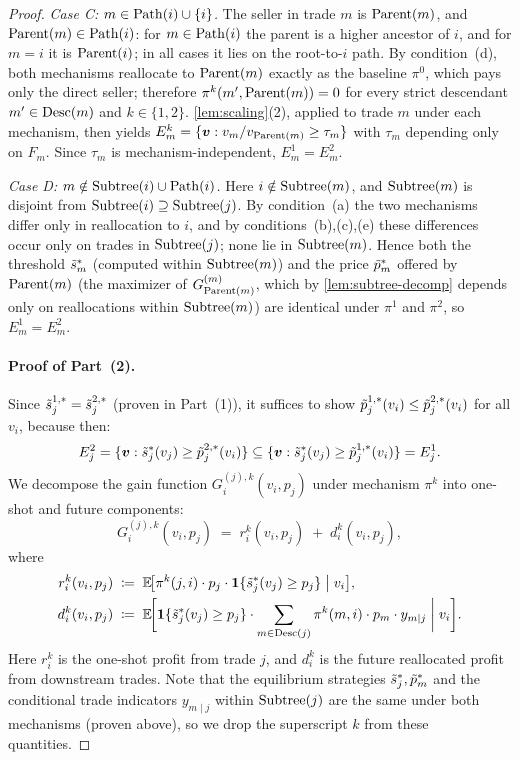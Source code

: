 \begin{proof}
\emph{Case C: $m \in \operatorname{Path}(i) \cup \{i\}$.}
The seller in trade $m$ is $\operatorname{Parent}(m)$, and $\operatorname{Parent}(m) \in \operatorname{Path}(i)$: for $m \in \operatorname{Path}(i)$ the parent is a higher ancestor of $i$, and for $m = i$ it is $\operatorname{Parent}(i)$; in all cases it lies on the root-to-$i$ path. By condition~(d), both mechanisms reallocate to $\operatorname{Parent}(m)$ exactly as the baseline $\pi^0$, which pays only the direct seller; therefore $\pi^k(m', \operatorname{Parent}(m)) = 0$ for every strict descendant $m' \in \operatorname{Desc}(m)$ and $k \in \{1,2\}$. \cref{lem:scaling}(2), applied to trade $m$ under each mechanism, then yields $E^k_m = \{{\bm{v}} : v_m / v_{\operatorname{Parent}(m)} \ge \tau_m\}$ with $\tau_m$ depending only on $F_m$. Since $\tau_m$ is mechanism-independent, $E^1_m = E^2_m$.

\emph{Case D: $m \notin \operatorname{Subtree}(i) \cup \operatorname{Path}(i)$.}
Here $i \notin \operatorname{Subtree}(m)$, and $\operatorname{Subtree}(m)$ is disjoint from $\operatorname{Subtree}(i) \supseteq \operatorname{Subtree}(j)$. By condition~(a) the two mechanisms differ only in reallocation to $i$, and by conditions~(b),(c),(e) these differences occur only on trades in $\operatorname{Subtree}(j)$; none lie in $\operatorname{Subtree}(m)$. Hence both the threshold $\tilde{s}^*_m$ (computed within $\operatorname{Subtree}(m)$) and the price $\tilde{p}^*_m$ offered by $\operatorname{Parent}(m)$ (the maximizer of $G^{(m)}_{\operatorname{Parent}(m)}$, which by \cref{lem:subtree-decomp} depends only on reallocations within $\operatorname{Subtree}(m)$) are identical under $\pi^1$ and $\pi^2$, so $E^1_m = E^2_m$.

\paragraph{Proof of Part~(2).}
Since $\tilde{s}^{1,*}_j = \tilde{s}^{2,*}_j$ (proven in Part~(1)), it suffices to show $\tilde{p}^{1,*}_j(v_i) \le \tilde{p}^{2,*}_j(v_i)$ for all $v_i$, because then:
\[
E^2_j = \{{\bm{v}} : \tilde{s}^*_j(v_j) \ge \tilde{p}^{2,*}_j(v_i)\} \subseteq \{{\bm{v}} : \tilde{s}^*_j(v_j) \ge \tilde{p}^{1,*}_j(v_i)\} = E^1_j.
\]
We decompose the gain function $G^{(j),k}_i(v_i, p_j)$ under mechanism $\pi^k$ into one-shot and future components:
\begin{equation}
\label{eq:prf:partial:decomp}
G^{(j),k}_i(v_i, p_j) \;=\; r^k_i(v_i, p_j) \;+\; d^k_i(v_i, p_j),
\end{equation}
where
\begin{align*}
r^k_i(v_i, p_j) &\;\coloneqq\; \mathbb{E}\!\big[\pi^k(j,i) \cdot p_j \cdot \bm{1}\{\tilde{s}^*_j(v_j) \ge p_j\} \;\big|\; v_i\big], \\
d^k_i(v_i, p_j) &\;\coloneqq\; \mathbb{E}\!\bigg[\bm{1}\{\tilde{s}^*_j(v_j) \ge p_j\} \cdot \sum_{m \in \operatorname{Desc}(j)} \pi^k(m,i) \cdot p_m \cdot y_{m \mid j} \;\bigg|\; v_i\bigg].
\end{align*}
Here $r^k_i$ is the one-shot profit from trade $j$, and $d^k_i$ is the future reallocated profit from downstream trades. Note that the equilibrium strategies $\tilde{s}^*_j, \tilde{p}^*_m$ and the conditional trade indicators $y_{m \mid j}$ within $\operatorname{Subtree}(j)$ are the same under both mechanisms (proven above), so we drop the superscript $k$ from these quantities.


\end{proof}
